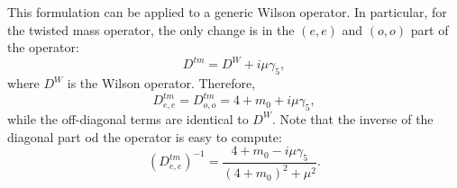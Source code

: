 \documentclass{article}
\begin{document}
This formulation can be applied to a generic Wilson operator. In particular, for the twisted mass operator, the only change is in the $(e,e)$ and $(o,o)$ part of the operator:
\begin{equation}
    D^{tm} = D^W + i \mu \gamma_5,
\end{equation}
where $D^W$ is the Wilson operator. Therefore,
\begin{equation}
    D^{tm}_{e,e} = D^{tm}_{o,o} = 4 + m_0 + i \mu \gamma_5,
\end{equation}
while the off-diagonal terms are identical to $D^W$. Note that the inverse of the diagonal part od the operator is easy to compute:
\begin{equation}
    (D^{tm}_{e,e})^{-1} =\frac{ 4 + m_0 - i \mu \gamma_5}{(4+m_0)^2 + \mu^2}.
\end{equation}
\end{document}

